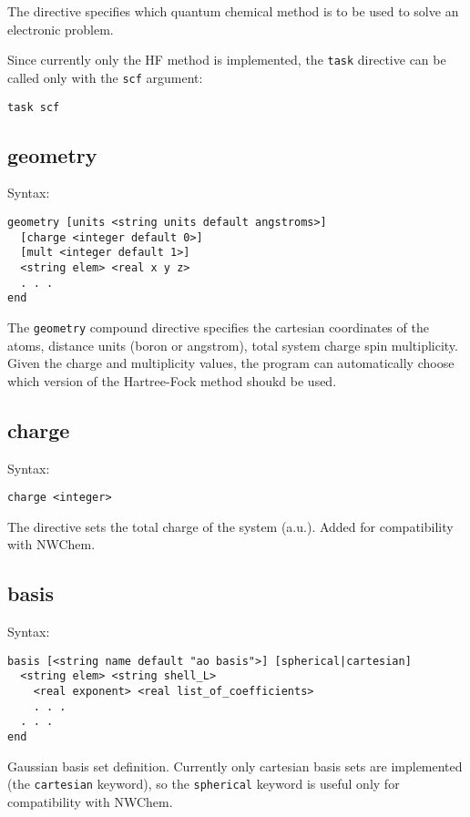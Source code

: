 \documentclass[a4paper, 12pt]{article}
\begin{document}
The directive specifies which quantum chemical method is to be used to solve an electronic problem.

Since currently only the HF method is implemented, the \texttt{task} directive can be called only with the \texttt{scf} argument:

\begin{lstlisting}
task scf
\end{lstlisting}

\subsection{geometry}

Syntax:

\begin{lstlisting}
geometry [units <string units default angstroms>]
  [charge <integer default 0>]
  [mult <integer default 1>]
  <string elem> <real x y z>
  . . .
end
\end{lstlisting}

The \texttt{geometry} compound directive specifies the cartesian coordinates of the atoms, distance units (boron or angstrom), total system charge spin multiplicity. Given the charge and multiplicity values, the program can automatically choose which version of the Hartree-Fock method shoukd be used.

\subsection{charge}
Syntax:

\begin{lstlisting}
charge <integer>
\end{lstlisting}

The directive sets the total charge of the system (a.u.). Added for compatibility with NWChem.

\subsection{basis}

Syntax:

\begin{lstlisting}
basis [<string name default "ao basis">] [spherical|cartesian]
  <string elem> <string shell_L>
    <real exponent> <real list_of_coefficients>
    . . .
  . . .
end
\end{lstlisting}

Gaussian basis set definition. Currently only cartesian basis sets are implemented (the \texttt{cartesian} keyword), so the \texttt{spherical} keyword is useful only for compatibility with NWChem.
\end{document}
